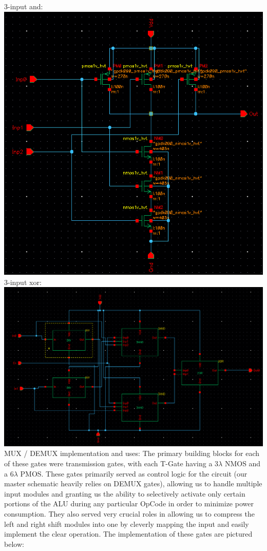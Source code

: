\documentclass[12pt]{article}
\begin{document}
  3-input and:\\
  \includegraphics[scale=0.4]{3and.png}
  \\

  3-input xor:\\
  \includegraphics[scale=0.4]{xor.png}
  \\
	
	MUX / DEMUX implementation and uses:
	The primary building blocks for each of these gates were transmission gates, with each 
	T-Gate having a 3$\lambda$ NMOS and a 6$\lambda$ PMOS. These gates primarily served
	as control logic for the circuit (our master schematic heavily relies on DEMUX gates), 
	allowing us to handle multiple input modules and granting us the ability to selectively 
	activate only certain portions of the ALU during any particular OpCode
	in order to minimize power consumption. They also served very crucial roles in allowing us to
	compress the left and right shift modules into one by cleverly mapping the input and easily 
	implement the clear operation. The implementation of these gates are pictured below:
	
\end{document}
